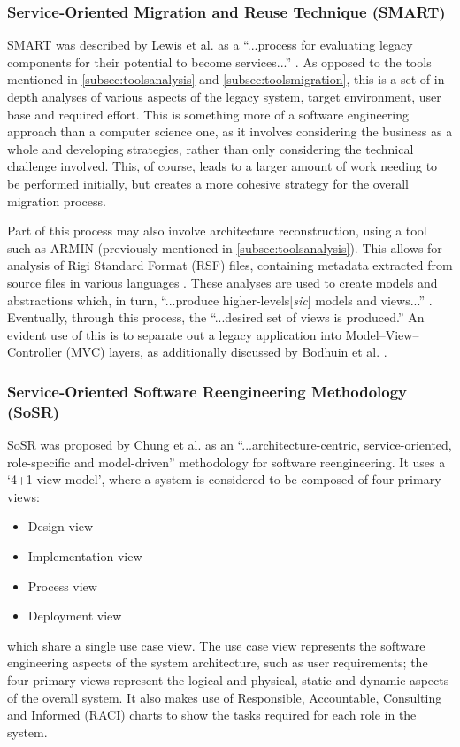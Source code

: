 \documentclass[12pt,journal,compsoc]{IEEEtran}
\begin{document}
\subsubsection{Service-Oriented Migration and Reuse Technique (SMART)}
\label{subsubsec:smart}
SMART was described by Lewis et al. as a ``...process for evaluating legacy components for their potential to become services...'' \cite{Lewis2005,Lewis2005a}. As opposed to the tools mentioned in \autoref{subsec:toolsanalysis} and \autoref{subsec:toolsmigration}, this is a set of in-depth analyses of various aspects of the legacy system, target environment, user base and required effort. This is something more of a software engineering approach than a computer science one, as it involves considering the business as a whole and developing strategies, rather than only considering the technical challenge involved. This, of course, leads to a larger amount of work needing to be performed initially, but creates a more cohesive strategy for the overall migration process.

Part of this process may also involve architecture reconstruction, using a tool such as ARMIN (previously mentioned in \autoref{subsec:toolsanalysis}). This allows for analysis of Rigi Standard Format (RSF) \cite{Kienle2010} files, containing metadata extracted from source files in various languages \cite{O'Brien2005}. These analyses are used to create models and abstractions which, in turn, ``...produce higher-levels[\textit{sic}] models and views...'' \cite{O'Brien2005}. Eventually, through this process, the ``...desired set of views is produced.'' \cite{O'Brien2005} An evident use of this is to separate out a legacy application into Model--View--Controller (MVC) layers, as additionally discussed by Bodhuin et al. \cite{Bodhuin2002}.

\subsubsection{Service-Oriented Software Reengineering Methodology (SoSR)}
\label{subsubsec:sosr}
SoSR was proposed by Chung et al. as an ``...architecture-centric, service-oriented, role-specific and model-driven'' \cite{Chung2007} methodology for software reengineering. It uses a `4+1 view model', where a system is considered to be composed of four primary views:
\begin{itemize}
\item Design view
\item Implementation view
\item Process view
\item Deployment view
\end{itemize}
which share a single use case view. The use case view represents the software engineering aspects of the system architecture, such as user requirements; the four primary views represent the logical and physical, static and dynamic aspects of the overall system. It also makes use of Responsible, Accountable, Consulting and Informed (RACI) charts \cite{Smith2005} to show the tasks required for each role in the system.
\end{document}
